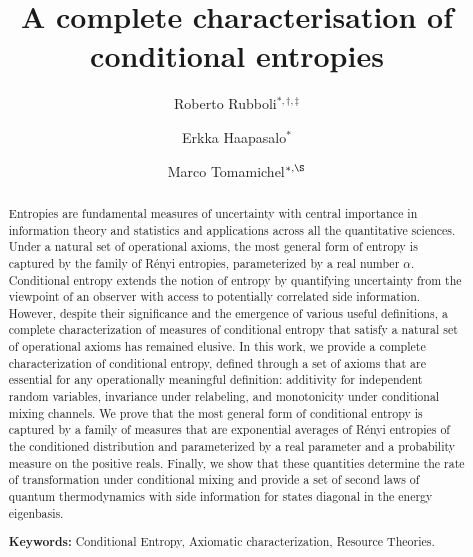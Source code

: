 \documentclass[aps,pra,11pt,onecolumn,nofootinbib,tightenlines]{revtex4-2}
\theoremstyle{definition}
\newcommand{\RR}[1]{\textcolor{red}{(RR: #1)}}
\begin{document}
\title{\Large A complete characterisation of conditional entropies}

\begin{abstract}
Entropies are fundamental measures of uncertainty with central importance in information theory and statistics and applications across all the quantitative sciences. Under a natural set of operational axioms, the most general form of entropy is captured by the family of Rényi entropies, parameterized by a real number $\alpha$.
%
Conditional entropy extends the notion of entropy by quantifying uncertainty from the viewpoint of an observer with access to potentially correlated side information. However, despite their significance and the emergence of various useful definitions, a complete characterization of measures of conditional entropy that satisfy a natural set of operational axioms has remained elusive.
%
In this work, we provide a complete characterization of conditional entropy, defined through a set of axioms that are essential for any operationally meaningful definition: additivity for independent random variables, invariance under relabeling, and monotonicity under conditional mixing channels.
%
We prove that the most general form of conditional entropy is captured by a family of measures that are exponential averages of Rényi entropies of the conditioned distribution and parameterized by a real parameter and a probability measure on the positive reals. Finally, we show that these quantities determine the rate of transformation under conditional mixing and provide a set of second laws of quantum thermodynamics with side information for states diagonal in the energy eigenbasis.



\bigskip

\noindent\textbf{Keywords:} Conditional Entropy, Axiomatic characterization, Resource Theories.

\end{abstract}

\medskip




\author{Roberto Rubboli$^{*,\dagger,\ddagger}$}
\author{Erkka Haapasalo$^{*}$}
\author{Marco Tomamichel$^{*,\S}$}
\end{document}
